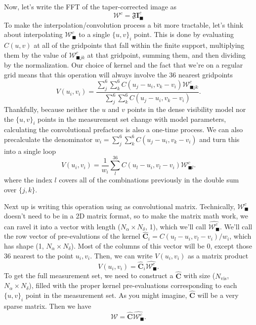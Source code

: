 \documentclass[modern]{aastex62}
\newcommand{\im}{\boldsymbol{I}_\blacksquare}
\newcommand{\vm}{\boldsymbol{\mathcal{W}}} %
\begin{document}
Now, let's write the FFT of the taper-corrected image as 
\begin{equation}
    \vm^c = \mathfrak{F} \im^c
\end{equation}
To make the interpolation/convolution process a bit more tractable, let's think about interpolating $\vm^c_\blacksquare$ to a single $\{u, v\}_i$ point. This is done by evaluating $C(u, v)$ at all of the gridpoints that fall within the finite support, multiplying them by the value of $\mathcal{W}^c_{\blacksquare jk}$ at that gridpoint, summing them, and then dividing by the normalization. Our choice of kernel and the fact that we're on a regular grid means that this operation will always involve the 36 nearest gridpoints
\begin{equation}
    V(u_i, v_i) = \frac{\sum_j^6 \sum_k^6 C(u_j - u_i, v_k - v_i) \mathcal{W}^c_{\blacksquare jk}}{\sum_j^6 \sum_k^6 C(u_j - u_i, v_k - v_i)}.
\end{equation}
Thankfully, because neither the $u$ and $v$ points in the dense visibility model nor the $\{u,v\}_i$ points in the measurement set change with model parameters, calculating the convolutional prefactors is also a one-time process. We can also precalculate the denominator $w_i = \sum_j^6 \sum_k^6 C(u_j - u_i, v_k - v_i)$ and turn this into a single loop
\begin{equation}
 V(u_i, v_i) = \frac{1}{w_i}\sum_l^{36} C(u_l - u_i, v_l - v_i) \mathcal{W}^c_{\blacksquare l}.
 \end{equation}
 where the index $l$ covers all of the combinations previously in the double sum over $\{j, k\}$. 
 
 Next up is writing this operation using as convolutional matrix. Technically, $\vm^c_\blacksquare$ doesn't need to be in a 2D matrix format, so to make the matrix math work, we can ravel it into a vector with length ($N_\alpha \times N_\delta$, 1), which we'll call $\hat{\vm_\blacksquare^c}$. We'll call the row vector of pre-evalutions of the kernel $\hat{\boldsymbol{C}}_i = C(u_l - u_i, v_l - v_i) / w_i$, which has shape (1, $N_\alpha \times N_\delta$). Most of the columns of this vector will be $0$, except those 36 nearest to the point $u_i, v_i$. Then, we can write $V(u_i, v_i)$ as a matrix product
 \begin{equation}
     V(u_i, v_i) = \hat{\boldsymbol{C}}_i \hat{\vm_\blacksquare^c}.
 \end{equation}
 To get the full measurement set, we need to construct a $\hat{\boldsymbol{C}}$ with size ($N_\mathrm{vis}$, $N_\alpha \times N_\delta$), filled with the proper kernel pre-evaluations corresponding to each $\{u,v\}_i$ point in the measurement set. As you might imagine, $\hat{\boldsymbol{C}}$ will be a very sparse matrix. Then we have
  \begin{equation}
     \vm = \hat{\boldsymbol{C}} \hat{\vm_\blacksquare^c}.
 \end{equation}
\end{document}
